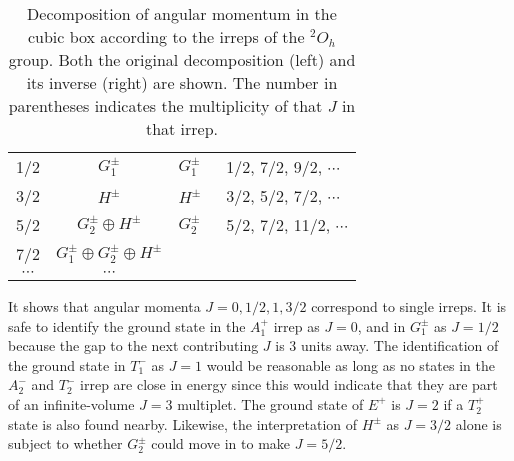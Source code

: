 \documentclass[aps,prd,reprint,showpacs,floatfix,longbibliography,,superscriptaddress]{revtex4-1}
\begin{document}
\begin{widetext}
\begin{table}
\begin{tabular}{c c | l l}
1/2 & $G^\pm_1$                                                        & $G^\pm_1\;\;$  & 1/2, 7/2, 9/2,  $\cdots$ \\
3/2 & $H^\pm$                                                            &  $H^\pm\;\;$      & 3/2, 5/2, 7/2,  $\cdots$ \\
5/2 & $G^\pm_2 \oplus H^\pm $                                 & $G^\pm_2\;\;$  & 5/2, 7/2, 11/2,  $\cdots$ \\
7/2 & $G_1^\pm\oplus G^\pm_2 \oplus H^\pm $        & &\\
$\cdots$ & $\cdots$  \\
\bottomrule
\end{tabular}
\caption{Decomposition of angular momentum in the cubic box according to the irreps of the $^2O_h$ group. 
Both the original decomposition (left) and its inverse (right) are shown. The number in parentheses indicates the multiplicity of that $J$ in that irrep. }
\label{tab:2Oh}
\end{table}
%
It shows that angular momenta $J= 0, 1/2, 1,3/2$ correspond to single irreps.
It is safe to identify the ground state in the $A^+_1$ irrep as $J=0$, and in $G^\pm_1$ as $J=1/2$ because the gap to the next contributing $J$ is 3 units away. The identification of the ground state in $T^-_1$ as $J=1$ would be reasonable as long as no states in the $A^-_2$ and $T^-_2$ irrep are close in energy since this would indicate that they are part of an infinite-volume $J=3$ multiplet. 
The ground state of $E^+$ is $J=2$ if a $T^+_2$ state is also found nearby.
Likewise, the interpretation of $H^\pm$ as $J = 3/2$ alone is subject to whether $G^\pm_2$ could move in to make $J = 5/2$.



\end{widetext}
\end{document}
